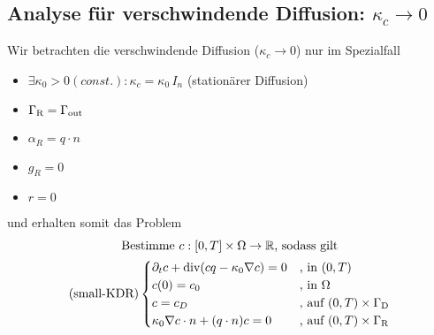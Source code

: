 \subsection{Analyse für verschwindende Diffusion: $ \kappa_c \to 0 $}
\label{Analyse für verschwindende Diffusion}
Wir betrachten die verschwindende Diffusion ($ \kappa_c \to 0 $) nur im Spezialfall
\begin{itemize}
	\item  $ \exists \kappa_0 > 0 (const.): \kappa_c = \kappa_0 \, I_n $ (stationärer Diffusion)
	\item $ \Gamma_{\text{R}} = \Gamma_{{\text{out}}} $
	\item $ \alpha_R = q \cdot n $
	\item $ g_R = 0 $
	\item $ r = 0 $
\end{itemize}
und erhalten somit das Problem
\begin{gather*}
	\text{Bestimme }  c:[0,T] \times \Omega \to \R \text{, sodass gilt}\\
	\sDKDR\begin{cases}
		\partial_t c + \dive(c q - \kappa_0 \nabla c) = 0 &\text{, in } (0,T) \time \Omega\\
		c(0) = c_0  &\text{, in } \Omega\\
		c = c_D &\text{, auf } (0,T) \times \GammaD \\
		\kappa_0 \nabla c \cdot n + (q \cdot n) c = 0 &\text{, auf } (0,T) \times \GammaR
	\end{cases}
\end{gather*}

%
%	
%	
%	

